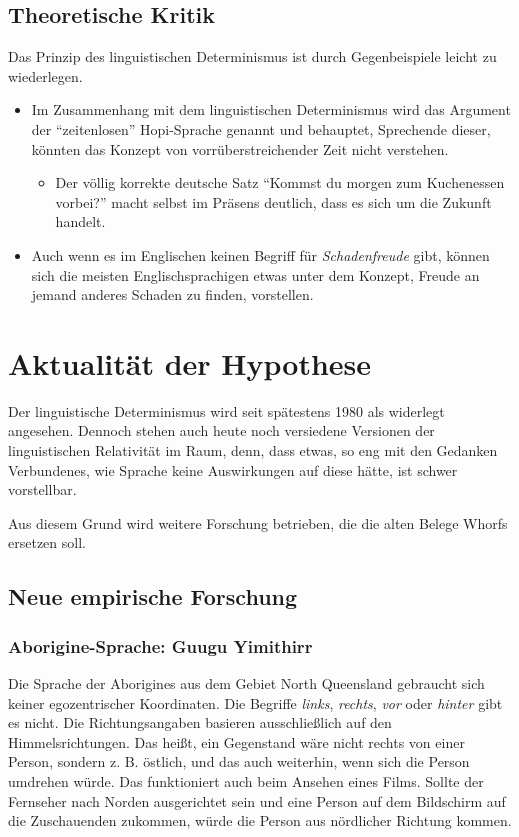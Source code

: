 \documentclass[12pt]{scrreprt}
\begin{document}
		\subsection{Theoretische Kritik}
		\label{sec:sawo_theokritik}
		Das Prinzip des linguistischen Determinismus ist durch Gegenbeispiele leicht
		zu wiederlegen.
		\begin{itemize}
			\item Im Zusammenhang mit dem linguistischen Determinismus wird das
			Argument der \enquote{zeitenlosen} Hopi-Sprache genannt und behauptet,
			Sprechende dieser, könnten das Konzept von vorrüberstreichender Zeit nicht
			verstehen.
				\begin{itemize}
					\item Der völlig korrekte deutsche Satz \enquote{Kommst du morgen zum
					Kuchenessen vorbei?} macht selbst im Präsens deutlich, dass es sich um
					die Zukunft handelt.
				\end{itemize}
				\item Auch wenn es im Englischen keinen Begriff für \textit{Schadenfreude}
				gibt, können sich die meisten Englischsprachigen etwas unter dem Konzept,
				Freude an jemand anderes Schaden zu finden, vorstellen.\autocite{article:Linguistic_Relativity}
		\end{itemize}

	\section{Aktualität der Hypothese}
	\label{sec:sawo_aktualität}
	Der linguistische Determinismus wird seit spätestens 1980 als widerlegt
	angesehen.\autocite{article:Linguistic_Relativity2}
	Dennoch stehen auch heute noch versiedene Versionen der linguistischen
	Relativität im Raum, denn, dass etwas, so eng mit den Gedanken Verbundenes, wie
	Sprache keine Auswirkungen auf diese hätte, ist schwer vorstellbar.

	Aus diesem Grund wird weitere Forschung betrieben, die die alten Belege Whorfs
	ersetzen soll.
		\subsection{Neue empirische Forschung}
		\label{sec:sawo_empforschung}
		\subsubsection{Aborigine-Sprache: Guugu Yimithirr}
		\label{sec:sawo_guuguyim}
		Die Sprache der Aborigines aus dem Gebiet North Queensland gebraucht sich
		keiner egozentrischer Koordinaten. Die Begriffe \textit{links},
		\textit{rechts}, \textit{vor} oder \textit{hinter} gibt es nicht. Die
		Richtungsangaben basieren ausschließlich auf den Himmelsrichtungen. Das heißt,
		ein Gegenstand wäre nicht rechts von einer Person, sondern z. B. östlich, und das
		auch weiterhin, wenn sich die Person umdrehen würde. Das funktioniert auch
		beim Ansehen eines Films. Sollte der Fernseher nach Norden ausgerichtet
		sein und eine Person auf dem Bildschirm auf die Zuschauenden zukommen, würde
		die Person aus nördlicher Richtung kommen.
\end{document}
